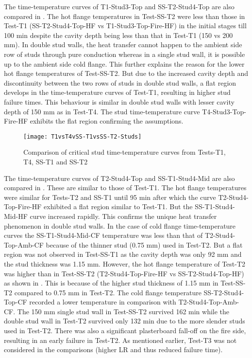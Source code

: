The time-temperature curves of T1-Stud3-Top and SS-T2-Stud4-Top are also compared in . The hot flange temperatures in Test-SS-T2 were less than those in Test-T1 (SS-T2-Stud4-Top-HF vs T1-Stud3-Top-Fire-HF) in the initial stages till 100 min despite the cavity depth being less than that in Test-T1 (150 vs 200 mm). In double stud walls, the heat transfer cannot happen to the ambient side row of studs through pure conduction whereas in a single stud wall, it is possible up to the ambient side cold flange. This further explains the reason for the lower hot flange temperatures of Test-SS-T2. But due to the increased cavity depth and discontinuity between the two rows of studs in double stud walls, a flat region develops in the time-temperature curves of Test-T1, resulting in higher stud failure times. This behaviour is similar in double stud walls with lesser cavity depth of 150 mm as in Test-T4. The stud time-temperature curve T4-Stud3-Top-Fire-HF exhibits the flat region confirming the assumptions.
\begin{figure}[!htbp]
	\centering
		\texttt{[image: T1vsT4vSS-T1vsSS-T2-Studs]}  
	\caption{Comparison of critical stud time-temperature curves from Tests-T1, T4, SS-T1 and SS-T2}
	\label{fig:T1vsT4vSS-T1vsSS-T2-Studs}
\end{figure}

The time-temperature curves of T2-Stud4-Top and SS-T1-Stud4-Mid are also compared in . These are similar to those of Test-T1. The hot flange temperatures were similar for Tests-T2 and SS-T1 until 95 min after which the curve T2-Stud4-Top-Fire-HF exhibited a flat region similar to Test-T1. But the SS-T1-Stud4-Mid-HF curve increased rapidly. This confirms the unique heat transfer phenomenon in double stud walls. In the case of cold flange time-temperature curves the SS-T1-Stud4-Mid-CF temperature was less than that of T2-Stud4-Top-Amb-CF because of the thinner stud (0.75 mm) used in Test-T2. But a flat region was not observed in Test-SS-T1 as the cavity depth was only 92 mm and the stud thickness was 1.15 mm. However, the hot flange temperature of Test-T2 was higher than in Test-SS-T2 (T2-Stud4-Top-Fire-HF vs SS-T2-Stud4-Top-HF) as shown in . This is because of the higher stud thickness of 1.15 mm in Test-SS-T2 compared to 0.75 mm in Test-T2. The cold flange temperature SS-T2-Stud4-Top-CF recorded a lower temperature in comparison with T2-Stud4-Top-Amb-CF. The 150 mm single stud wall in Test-SS-T2 survived 162 min while the double stud wall in Test-T2 survived only 132 min due to the more slender studs used in Test-T2. There was also a significant plasterboard fall-off on the fire side, resulting in an early failure in Test-T2. As mentioned earlier, Test-T3 was not considered in the comparisons (higher LR and thus reduced failure time).

